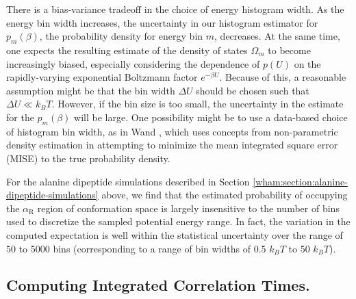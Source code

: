 There is a bias-variance tradeoff in the choice of energy histogram width.  As the energy bin width increases, the uncertainty in our histogram estimator for $p_m(\beta)$, the probability density for energy bin $m$, decreases.  At the same time, one expects the resulting estimate of the density of states $\Omega_m$ to become increasingly biased, especially considering the dependence of $p(U)$ on the rapidly-varying exponential Boltzmann factor $e^{-\beta U}$.  Because of this, a reasonable assumption might be that the bin width $\Delta U$ should be chosen such that $\Delta U \ll k_B T$.  However, if the bin size is too small, the uncertainty in the estimate for the $p_m(\beta)$ will be large.  One possibility might be to use a data-based choice of histogram bin width, as in Wand \cite{wand:1997a}, which uses concepts from non-parametric density estimation in attempting to minimize the mean integrated square error (MISE) to the true probability density.

For the alanine dipeptide simulations described in Section \ref{wham:section:alanine-dipeptide-simulations} above, we find that the estimated probability of occupying the $\alpha_\mathrm{R}$ region of conformation space is largely insensitive to the number of bins used to discretize the sampled potential energy range.  In fact, the variation in the computed expectation is well within the statistical uncertainty over the range of 50 to 5000 bins (corresponding to a range of bin widths of 0.5 $k_B T$ to 50 $k_B T$).

\subsection{Computing Integrated Correlation Times.}
\label{wham:section:fast-integrated-correlation-estimates}

